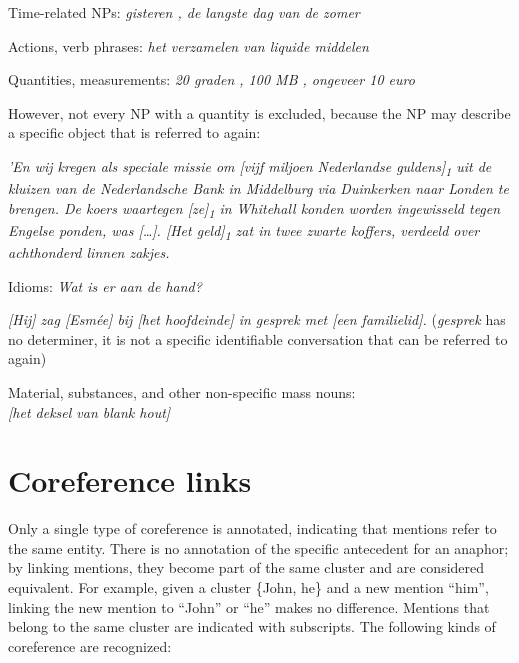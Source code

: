 \begin{itemize*}
\item Time-related NPs: \emph{\n{[}gisteren\n{]} , \n{[}de langste dag van
  de zomer\n{]}}
\item Actions, verb phrases: \emph{\n{[}het verzamelen van liquide
  middelen\n{]}}
\item Quantities, measurements: \emph{\n{[}20 graden\n{]} , \n{[}100
  MB\n{]} , \n{[}ongeveer 10 euro\n{]}}

  However, not every NP with a quantity is excluded, because the NP may describe a specific object that is referred to again:

  \emph{'En wij kregen als speciale missie om [vijf miljoen Nederlandse
  guldens]\textsubscript{1} uit de kluizen van de Nederlandsche Bank in
  Middelburg via Duinkerken naar Londen te brengen.
  De koers waartegen [ze]\textsubscript{1} in Whitehall konden worden
  ingewisseld tegen Engelse ponden, was [\dots]. [Het geld]\textsubscript{1}
  zat in twee zwarte koffers, verdeeld over achthonderd linnen zakjes.}

\item Idioms: \emph{Wat is er aan \n{[}de hand\n{]}?}

    \emph{[Hij] zag [Esmée] bij [het hoofdeinde] in \n{[}gesprek\n{]} met [een familielid].} (\emph{gesprek} has no determiner, it is not a specific identifiable conversation that can be referred to again)

\item Material, substances, and other non-specific mass nouns:\\
    \emph{[het deksel van \n{[}blank hout\n{]}]}

\end{itemize*}



\section{Coreference links}

Only a single type of coreference is annotated, indicating that
mentions refer to the same entity. There is no annotation of the
specific antecedent for an anaphor; by linking mentions, they become
part of the same cluster and are considered equivalent. For example,
given a cluster \{John, he\} and a new mention ``him'', linking the new
mention to ``John'' or ``he'' makes no difference. Mentions that belong to the
same cluster are indicated with subscripts. The following kinds of
coreference are recognized:

